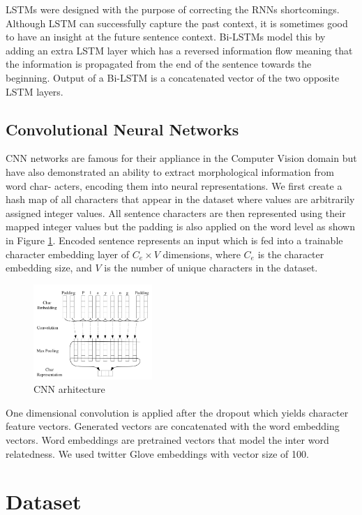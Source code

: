 \documentclass[10pt, a4paper]{article}
\begin{document}
LSTMs were designed with the purpose of correcting the RNNs shortcomings. Although LSTM can successfully capture the past context, it is sometimes good
to have an insight at the future sentence context. Bi-LSTMs model
this by adding an extra LSTM layer which has a reversed information flow
meaning that the information is propagated from the end of the sentence towards
the beginning. Output of a Bi-LSTM is a concatenated vector of the two opposite
LSTM layers.

\subsection{Convolutional Neural Networks}
CNN networks are famous for their appliance in the Computer Vision domain but have also demonstrated an ability to extract morphological information from word char- acters, encoding them into neural representations. We first create a hash map of all characters that appear in the dataset where values are arbitrarily assigned integer values. All sentence characters are then represented using their
mapped integer values but the padding is also applied on the word level as shown in Figure \ref{fig:cnn_embed}.
Encoded sentence represents an input which is fed into a trainable character embedding
layer of $C_e \times V$ dimensions, where $C_e$ is the character embedding size,
and $V$ is the number of unique characters in the dataset.
\begin{figure}
  \caption{CNN arhitecture}
  \label{fig:cnn_embed}
  \centering
    \includegraphics[width=0.4\textwidth]{imgs/cnn_embed.png}
\end{figure}
One dimensional convolution is applied after the dropout which yields character feature vectors. Generated vectors are concatenated with the word embedding vectors. Word embeddings are pretrained vectors that model the inter word relatedness. We used twitter Glove embeddings with vector size of 100.



\section{Dataset}
\end{document}

